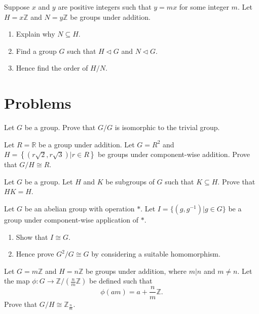 \begin{exercise}
    Suppose $x$ and $y$ are positive integers such that $y = mx$ for some integer $m$. Let $H = x\mathbb{Z}$ and $N = y\mathbb{Z}$ be groups under addition.
    \begin{enumerate}[label=(\roman*)]
        \item Explain why $N \subseteq H$.
        \item Find a group $G$ such that $H \lhd G$ and $N \lhd G$.
        \item Hence find the order of $H/N$.
    \end{enumerate}
\end{exercise}

\newpage

\section{Problems}
\begin{problem}
    Let $G$ be a group. Prove that $G/G$ is isomorphic to the trivial group.
\end{problem}

\begin{problem}
    Let $R = \mathbb{R}$ be a group under addition. Let $G = R^2$ and $H = \left\{(r\sqrt2, r\sqrt3) \vert r\in R\right\}$ be groups under component-wise addition. Prove that $G/H \cong R$.
\end{problem}

\begin{problem}\label{problem-subgroup-product-equal-to-subgroup-if-one-is-subgroup-of-another}
    Let $G$ be a group. Let $H$ and $K$ be subgroups of $G$ such that $K \subseteq H$. Prove that $HK = H$.
\end{problem}

\begin{problem}\label{problem-cartesian-product-of-group-by-group-isomorphic-to-group}
    Let $G$ be an abelian group with operation $\ast$. Let $I = \{(g, g^{-1}) \vert g \in G\}$ be a group under component-wise application of $\ast$.
    \begin{enumerate}[label=(\roman*)]
        \item Show that $I \cong G$.
        \item Hence prove $G^2/G \cong G$ by considering a suitable homomorphism.
    \end{enumerate}
\end{problem}

\begin{problem}\label{problem-mZ/nZ-isomorphic-to-Zn/m}
    Let $G = m\mathbb{Z}$ and $H = n\mathbb{Z}$ be groups under addition, where $m\vert n$ and $m \neq n$. Let the map $\phi: G \to \mathbb{Z}/({\frac nm}\mathbb{Z})$ be defined such that
    \[
        \phi(am) = a + \frac nm \mathbb{Z}.
    \]
    Prove that $G/H \cong \mathbb{Z}_{\frac nm}$.
\end{problem}

